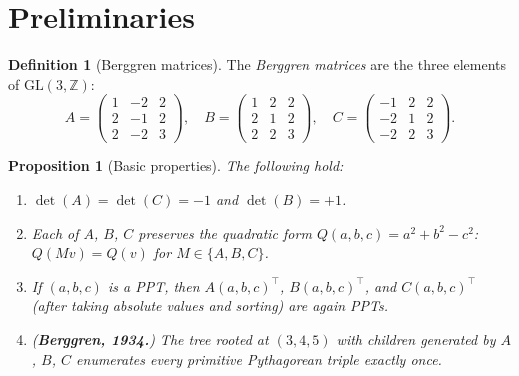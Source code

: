 \documentclass[12pt]{amsart}
\newtheorem{proposition}[theorem]{Proposition}
\theoremstyle{definition}
\newtheorem{definition}[theorem]{Definition}
\theoremstyle{remark}
\begin{document}

\section{Preliminaries}\label{sec:prelim}

\begin{definition}[Berggren matrices]\label{def:berggren}
The \emph{Berggren matrices} are the three elements of $\mathrm{GL}(3,\mathbb{Z})$:
\[
  A = \begin{pmatrix} 1 & -2 & 2 \\ 2 & -1 & 2 \\ 2 & -2 & 3 \end{pmatrix},
  \quad
  B = \begin{pmatrix} 1 & 2 & 2 \\ 2 & 1 & 2 \\ 2 & 2 & 3 \end{pmatrix},
  \quad
  C = \begin{pmatrix} -1 & 2 & 2 \\ -2 & 1 & 2 \\ -2 & 2 & 3 \end{pmatrix}.
\]
\end{definition}

\begin{proposition}[Basic properties]\label{prop:basic}
The following hold:
\begin{enumerate}[label=(\alph*)]
  \item $\det(A) = \det(C) = -1$ and $\det(B) = +1$.
  \item Each of $A$, $B$, $C$ preserves the quadratic form
    $Q(a,b,c) = a^2 + b^2 - c^2$: $Q(Mv) = Q(v)$ for $M \in \{A,B,C\}$.
  \item If $(a,b,c)$ is a PPT, then $A(a,b,c)^\top$, $B(a,b,c)^\top$, and
    $C(a,b,c)^\top$ (after taking absolute values and sorting) are again PPTs.
  \item (\textbf{Berggren, 1934.}) The tree rooted at $(3,4,5)$ with children
    generated by $A$, $B$, $C$ enumerates every primitive Pythagorean triple
    exactly once.
\end{enumerate}
\end{proposition}
\end{document}
